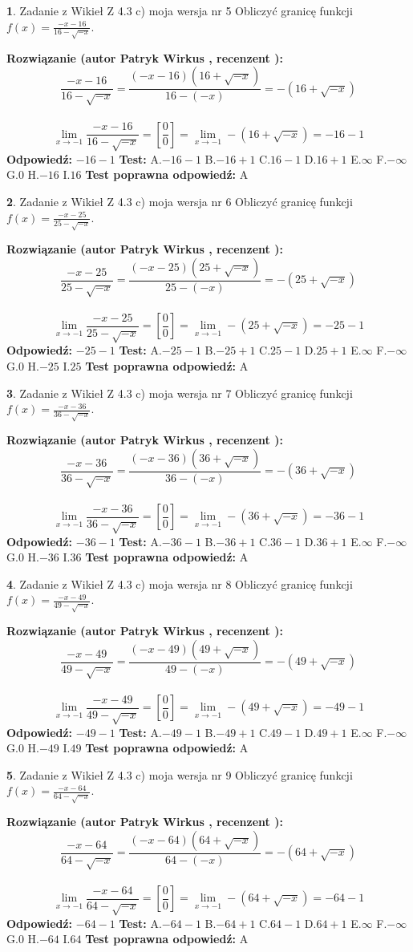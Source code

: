 \documentclass[12pt, a4paper]{article}
\theoremstyle{definition} %
\newtheorem{zad}{}
\newcommand{\zadStart}[1]{\begin{zad}#1\newline}
\newcommand{\zadStop}{\end{zad}}
\newcommand{\rozwStart}[2]{\noindent \textbf{Rozwiązanie (autor #1 , recenzent #2): }\newline}
\newcommand{\rozwStop}{\newline}
\newcommand{\odpStart}{\noindent \textbf{Odpowiedź:}\newline}
\newcommand{\odpStop}{\newline}
\newcommand{\testStart}{\noindent \textbf{Test:}\newline}
\newcommand{\testStop}{\newline}
\newcommand{\kluczStart}{\noindent \textbf{Test poprawna odpowiedź:}\newline}
\newcommand{\kluczStop}{\newline}
\begin{document}
\zadStart{Zadanie z Wikieł Z 4.3 c) moja wersja nr 5}
Obliczyć granicę funkcji $f(x)=\frac{-x-16}{16-\sqrt{-x}}$.
\zadStop
\rozwStart{Patryk Wirkus}{}
$$\frac{-x-16}{16-\sqrt{-x}}=\frac{(-x-16)(16+\sqrt{-x})}{16-(-x)}=-(16+\sqrt{-x})$$
\\
$$\lim\limits_{x\to-1}\frac{-x-16}{16-\sqrt{-x}}=[\frac{0}{0}]=\lim\limits_{x\to-1}-(16+\sqrt{-x}) =-16-1$$
\rozwStop
\odpStart
$-16-1$
\odpStop
\testStart
A.$-16-1$
B.$-16+1$
C.$16-1$
D.$16+1$
E.$\infty$
F.$-\infty$
G.$0$
H.$-16$
I.$16$
\testStop
\kluczStart
A
\kluczStop



\zadStart{Zadanie z Wikieł Z 4.3 c) moja wersja nr 6}
Obliczyć granicę funkcji $f(x)=\frac{-x-25}{25-\sqrt{-x}}$.
\zadStop
\rozwStart{Patryk Wirkus}{}
$$\frac{-x-25}{25-\sqrt{-x}}=\frac{(-x-25)(25+\sqrt{-x})}{25-(-x)}=-(25+\sqrt{-x})$$
\\
$$\lim\limits_{x\to-1}\frac{-x-25}{25-\sqrt{-x}}=[\frac{0}{0}]=\lim\limits_{x\to-1}-(25+\sqrt{-x}) =-25-1$$
\rozwStop
\odpStart
$-25-1$
\odpStop
\testStart
A.$-25-1$
B.$-25+1$
C.$25-1$
D.$25+1$
E.$\infty$
F.$-\infty$
G.$0$
H.$-25$
I.$25$
\testStop
\kluczStart
A
\kluczStop



\zadStart{Zadanie z Wikieł Z 4.3 c) moja wersja nr 7}
Obliczyć granicę funkcji $f(x)=\frac{-x-36}{36-\sqrt{-x}}$.
\zadStop
\rozwStart{Patryk Wirkus}{}
$$\frac{-x-36}{36-\sqrt{-x}}=\frac{(-x-36)(36+\sqrt{-x})}{36-(-x)}=-(36+\sqrt{-x})$$
\\
$$\lim\limits_{x\to-1}\frac{-x-36}{36-\sqrt{-x}}=[\frac{0}{0}]=\lim\limits_{x\to-1}-(36+\sqrt{-x}) =-36-1$$
\rozwStop
\odpStart
$-36-1$
\odpStop
\testStart
A.$-36-1$
B.$-36+1$
C.$36-1$
D.$36+1$
E.$\infty$
F.$-\infty$
G.$0$
H.$-36$
I.$36$
\testStop
\kluczStart
A
\kluczStop



\zadStart{Zadanie z Wikieł Z 4.3 c) moja wersja nr 8}
Obliczyć granicę funkcji $f(x)=\frac{-x-49}{49-\sqrt{-x}}$.
\zadStop
\rozwStart{Patryk Wirkus}{}
$$\frac{-x-49}{49-\sqrt{-x}}=\frac{(-x-49)(49+\sqrt{-x})}{49-(-x)}=-(49+\sqrt{-x})$$
\\
$$\lim\limits_{x\to-1}\frac{-x-49}{49-\sqrt{-x}}=[\frac{0}{0}]=\lim\limits_{x\to-1}-(49+\sqrt{-x}) =-49-1$$
\rozwStop
\odpStart
$-49-1$
\odpStop
\testStart
A.$-49-1$
B.$-49+1$
C.$49-1$
D.$49+1$
E.$\infty$
F.$-\infty$
G.$0$
H.$-49$
I.$49$
\testStop
\kluczStart
A
\kluczStop



\zadStart{Zadanie z Wikieł Z 4.3 c) moja wersja nr 9}
Obliczyć granicę funkcji $f(x)=\frac{-x-64}{64-\sqrt{-x}}$.
\zadStop
\rozwStart{Patryk Wirkus}{}
$$\frac{-x-64}{64-\sqrt{-x}}=\frac{(-x-64)(64+\sqrt{-x})}{64-(-x)}=-(64+\sqrt{-x})$$
\\
$$\lim\limits_{x\to-1}\frac{-x-64}{64-\sqrt{-x}}=[\frac{0}{0}]=\lim\limits_{x\to-1}-(64+\sqrt{-x}) =-64-1$$
\rozwStop
\odpStart
$-64-1$
\odpStop
\testStart
A.$-64-1$
B.$-64+1$
C.$64-1$
D.$64+1$
E.$\infty$
F.$-\infty$
G.$0$
H.$-64$
I.$64$
\testStop
\kluczStart
A
\kluczStop
\end{document}

